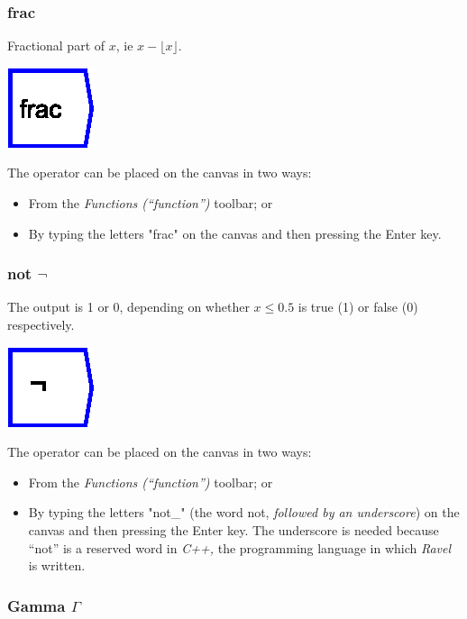 \subsubsection{frac}

\label{Operation:frac} Fractional part of $x$, ie $x-\lfloor x\rfloor$.

\includegraphics{images/frac}

The operator can be placed on the canvas in two ways:
\begin{itemize}
\item From the \emph{Functions (``function'')} toolbar; or 
\item By typing the letters "frac" on the canvas and then pressing the
Enter key.
\end{itemize}

\subsubsection{not $\neg$}

\label{Operation:not_} The output is 1 or 0, depending on whether
$x\le0.5$ is true (1) or false (0) respectively.

\includegraphics{images/not}

The operator can be placed on the canvas in two ways:
\begin{itemize}
\item From the \emph{Functions (``function'')} toolbar; or 
\item By typing the letters "not\_" (the word not, \emph{followed by an
underscore}) on the canvas and then pressing the Enter key. The underscore
is needed because ``not'' is a reserved word in \emph{C++,} the
programming language in which \emph{Ravel} is written.
\end{itemize}

\subsubsection{Gamma $\Gamma$}

